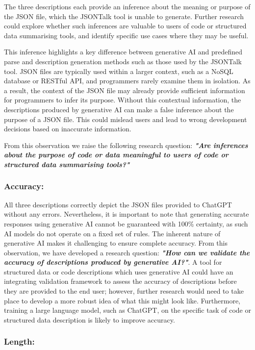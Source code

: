 \documentclass{l4proj}
\begin{document}
The three descriptions each provide an inference about the meaning or purpose of the JSON file, which the JSONTalk tool is unable to generate. Further research could explore whether such inferences are valuable to users of code or structured data summarising tools, and identify specific use cases where they may be useful.

This inference highlights a key difference between generative AI and predefined parse and description generation methods such as those used by the JSONTalk tool. JSON files are typically used within a larger context, such as a NoSQL database or RESTful API, and programmers rarely examine them in isolation. As a result, the context of the JSON file may already provide sufficient information for programmers to infer its purpose. Without this contextual information, the descriptions produced by generative AI can make a false inference about the purpose of a JSON file. This could mislead users and lead to wrong development decisions based on inaccurate information.

From this observation we raise the following research question: 
\textit{\textbf{"Are inferences about the purpose of code or data meaningful to users of code or structured data summarising tools?"}}

\subsubsection{Accuracy: } 

All three descriptions correctly depict the JSON files provided to ChatGPT without any errors. Nevertheless, it is important to note that generating accurate responses using generative AI cannot be guaranteed with 100\% certainty, as such AI models do not operate on a fixed set of rules. The inherent nature of generative AI makes it challenging to ensure complete accuracy. From this observation, we have developed a research question: \textit{\textbf{"How can we validate the accuracy of descriptions produced by generative AI?"}}. A tool for structured data or code descriptions which uses generative AI could have an integrating validation framework to assess the accuracy of descriptions before they are provided to the end user; however, further research would need to take place to develop a more robust idea of what this might look like. Furthermore, training a large language model, such as ChatGPT, on the specific task of code or structured data description is likely to improve accuracy.

\subsubsection{Length:}
\end{document}
